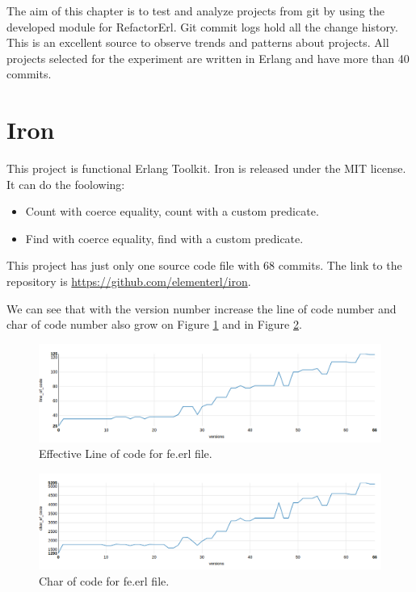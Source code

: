 The aim of this chapter is to test and analyze projects from git by using the developed module for RefactorErl. Git commit logs hold all the change history. This is an excellent source to observe trends and patterns about projects. All projects selected for the experiment are written in Erlang and have more than 40 commits.

\section{Iron}

This project is functional Erlang Toolkit. Iron is released under the MIT license. It can do the foolowing:
\begin{itemize}
	\item Count with coerce equality, count with a custom predicate.
	\item Find with coerce equality, find with a custom predicate.
\end{itemize}

This project has just only one source code file with 68 commits. The link to the repository is \url{https://github.com/elementerl/iron}.

We can see that with the version number increase the line of code number and char of code number also grow on Figure \ref{fig:loc_iron} and in Figure \ref{fig:char_iron}.

\begin{figure}[ht]
	\centering
	\includegraphics[width=\textwidth]{figures/loc_iron.png}
	\caption{Effective Line of code for fe.erl file.}
	\label{fig:loc_iron}
\end{figure}

\begin{figure}[ht]
	\centering
	\includegraphics[width=\textwidth]{figures/char_iron.png}
	\caption{Char of code for fe.erl file.}
	\label{fig:char_iron}
\end{figure}

